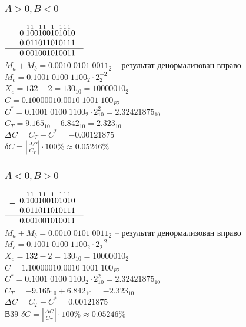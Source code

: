 \documentclass[12pt,a4paper]{report}
\begin{document}
\subsubsection*{$A>0, B<0$}
$
    \begin{array}{r}
    -
    \begin{array}{r}
    0.\overset{\small{1}}{1}\overset{\small{1}}{0}0\overset{\small{1}}{1}\overset{\small{1}}{0}0\overset{\small{1}}{1}0\overset{\small{1}}{1}\overset{\small{1}}{0}\overset{\small{1}}{1}0\\
    0.011011010111
    \end{array}\\
    \hline
    \begin{array}{r}
    0.001001010011
    \end{array}\\
    \end{array}
$\\
\hfill\break
$M_a+M_b=0.0010\;0101\;0011_2$ -- результат денормализован вправо\\
$M_c=0.1001\;0100\;1100_2\cdot 2_2^{-2}$\\
$X_c=132-2=130_{10}=10000010_2$\\
$C=0.10000010.0010\;1001\;100_{F2}$\\
$C^*=0.1001\;0100\;1100_2\cdot2_{10}^2=2.32421875_{10}$\\
$C_T=9.165_{10}-6.842_{10}=2.323_{10}$\\
$\Delta C=C_T-C^*=-0.00121875$\\
$\delta C=|\frac{\Delta C}{C_T}|\cdot100\%\approx0.05246\%$
\subsubsection*{$A<0, B>0$}
$
    \begin{array}{r}
    -
    \begin{array}{r}
    0.\overset{\small{1}}{1}\overset{\small{1}}{0}0\overset{\small{1}}{1}\overset{\small{1}}{0}0\overset{\small{1}}{1}0\overset{\small{1}}{1}\overset{\small{1}}{0}\overset{\small{1}}{1}0\\
    0.011011010111
    \end{array}\\
    \hline
    \begin{array}{r}
    0.001001010011
    \end{array}\\
    \end{array}
$\\
\hfill\break
$M_a+M_b=0.0010\;0101\;0011_2$ -- результат денормализован вправо\\
$M_c=0.1001\;0100\;1100_2\cdot 2_2^{-2}$\\
$X_c=132-2=130_{10}=10000010_2$\\
$C=1.10000010.0010\;1001\;100_{F2}$\\
$C^*=0.1001\;0100\;1100_2\cdot2_{10}^2=2.32421875_{10}$\\
$C_T=-9.165_{10}+6.842_{10}=-2.323_{10}$\\
$\Delta C=C_T-C^*=0.00121875$\\ В39
$\delta C=|\frac{\Delta C}{C_T}|\cdot100\%\approx0.05246\%$
\end{document}
